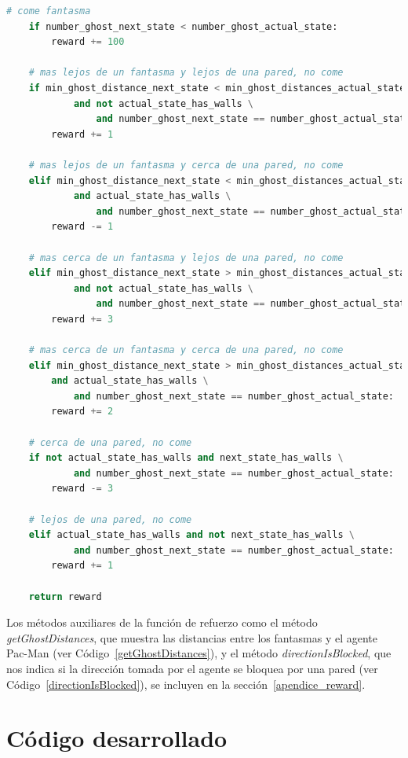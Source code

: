 \documentclass[11pt]{exam}
\begin{document}
\begin{lstlisting}[caption={Función de refuerzo.}, label={reward}, language=python, basicstyle=\scriptsize]
	# come fantasma
	if number_ghost_next_state < number_ghost_actual_state:
		reward += 100
	
	# mas lejos de un fantasma y lejos de una pared, no come
	if min_ghost_distance_next_state < min_ghost_distances_actual_state \
			and not actual_state_has_walls \
				and number_ghost_next_state == number_ghost_actual_state:
		reward += 1
	
	# mas lejos de un fantasma y cerca de una pared, no come
	elif min_ghost_distance_next_state < min_ghost_distances_actual_state \
			and actual_state_has_walls \
				and number_ghost_next_state == number_ghost_actual_state:
		reward -= 1
	
	# mas cerca de un fantasma y lejos de una pared, no come
	elif min_ghost_distance_next_state > min_ghost_distances_actual_state \
			and not actual_state_has_walls \
				and number_ghost_next_state == number_ghost_actual_state:
		reward += 3
	
	# mas cerca de un fantasma y cerca de una pared, no come
	elif min_ghost_distance_next_state > min_ghost_distances_actual_state \
		and actual_state_has_walls \
			and number_ghost_next_state == number_ghost_actual_state:
		reward += 2
	
	# cerca de una pared, no come
	if not actual_state_has_walls and next_state_has_walls \
			and number_ghost_next_state == number_ghost_actual_state:
		reward -= 3
		
	# lejos de una pared, no come
	elif actual_state_has_walls and not next_state_has_walls \
			and number_ghost_next_state == number_ghost_actual_state:
		reward += 1
	
	return reward
\end{lstlisting}

Los métodos auxiliares de la función de refuerzo como el método \textit{getGhostDistances}, que muestra las distancias entre los fantasmas y el agente Pac-Man (ver Código~\ref{getGhostDistances}), y el método \textit{directionIsBlocked}, que nos indica si la dirección tomada por el agente se bloquea por una pared (ver Código~\ref{directionIsBlocked}), se incluyen en la sección~\ref*{apendice_reward}.

\section{Código desarrollado}\label{codigo}
\end{document}
